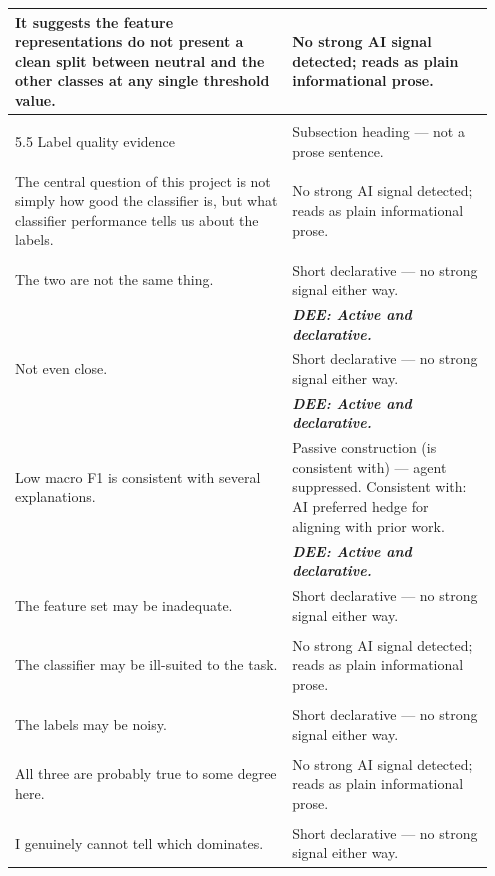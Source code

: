 \documentclass[11pt]{article}
\begin{document}
\begin{longtable}{|p{0.55\linewidth}|p{0.40\linewidth}|}
\hline
It suggests the feature representations do not present a clean split between neutral and the other classes at any single threshold value. & No strong AI signal detected; reads as plain informational prose. \\[2pt]
\hline
\rule{0pt}{3.5cm} & \\
\hline
5.5 Label quality evidence & Subsection heading --- not a prose sentence. \\[2pt]
\hline
\rule{0pt}{3.5cm} & \\
\hline
The central question of this project is not simply how good the classifier is, but what classifier performance tells us about the labels. & No strong AI signal detected; reads as plain informational prose. \\[2pt]
\hline
\rule{0pt}{3.5cm} & \\
\hline
The two are not the same thing. & Short declarative --- no strong signal either way. \\[2pt]
\hline
 & \textbf{\textit{DEE: Active and declarative.}}\\[2em]
\hline
Not even close. & Short declarative --- no strong signal either way. \\[2pt]
\hline
 & \textbf{\textit{DEE: Active and declarative.}}\\[2em]
\hline
Low macro F1 is consistent with several explanations. & Passive construction (is consistent with) --- agent suppressed. Consistent with: AI preferred hedge for aligning with prior work. \\[2pt]
\hline
 & \textbf{\textit{DEE: Active and declarative.}}\\[2em]
\hline
The feature set may be inadequate. & Short declarative --- no strong signal either way. \\[2pt]
\hline
\rule{0pt}{3.5cm} & \\
\hline
The classifier may be ill-suited to the task. & No strong AI signal detected; reads as plain informational prose. \\[2pt]
\hline
\rule{0pt}{3.5cm} & \\
\hline
The labels may be noisy. & Short declarative --- no strong signal either way. \\[2pt]
\hline
\rule{0pt}{3.5cm} & \\
\hline
All three are probably true to some degree here. & No strong AI signal detected; reads as plain informational prose. \\[2pt]
\hline
\rule{0pt}{3.5cm} & \\
\hline
I genuinely cannot tell which dominates. & Short declarative --- no strong signal either way. \\[2pt]

\end{longtable}
\end{document}
